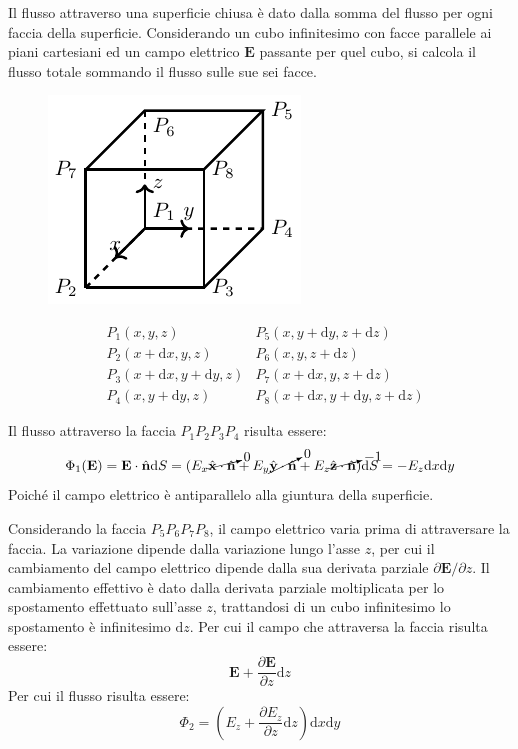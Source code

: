\documentclass{article}
\newcommand{\vect}[1]{\boldsymbol{\mathbf{#1}}}
\newcommand{\df}{\mathrm{d}}
\numberwithin{equation}{subsection}
\begin{document}
Il flusso attraverso una superficie chiusa è dato dalla somma del flusso per ogni faccia della superficie. Considerando un cubo infinitesimo con facce parallele ai piani 
cartesiani ed un campo elettrico $\vect{E}$ passante per quel cubo, si calcola il flusso totale sommando il flusso sulle sue sei facce. 
\begin{figure}[H]%
    \centering
    \includegraphics{teorema-divergenza.pdf}%
    \label{fig:teorema-divergenza}
\end{figure}
\begin{align*}
    &P_1(x,y,z) &P_5(x,y+\df  y,z+\df z)\\
    &P_2(x+\df  x,y,z) &P_6(x,y,z+\df z)\\
    &P_3(x+\df  x,y+\df  y,z) &P_7(x+\df  x,y,z+\df z)\\
    &P_4(x,y+\df  y,z) &P_8(x+\df  x,y+\df  y,z+\df z)
\end{align*}

Il flusso attraverso la faccia $P_1P_2P_3P_4$ risulta essere:
\begin{equation*}
    \Phi_1(\vect{E})=\vect{E}\cdot\hat{\vect{n}}\df S=(E_x\cancelto{0}{\hat{\vect{x}}\cdot\hat{\vect{n}}}+E_y\cancelto{0}{\hat{\vect{y}}\cdot\hat{\vect{n}}}+E_z\cancelto{-1}{\hat{\vect{z}}\cdot\hat{\vect{n}}})\df S=-E_z\df x\df y
\end{equation*}
Poiché il campo elettrico è antiparallelo alla giuntura della superficie. 


Considerando la faccia $P_5P_6P_7P_8$, il campo elettrico varia prima di attraversare la faccia. La variazione dipende dalla variazione lungo l'asse $z$, per cui il cambiamento 
del campo elettrico dipende dalla sua derivata parziale ${\partial\vect{E}}/{\partial z}$. Il cambiamento effettivo è dato dalla derivata parziale 
moltiplicata per lo spostamento effettuato sull'asse $z$, trattandosi di un cubo infinitesimo lo spostamento è infinitesimo $\df z$. Per cui il campo che attraversa la faccia 
risulta essere:
\begin{equation*}
    \vect{E}+\displaystyle\frac{\partial \vect{E}}{\partial z}\df z
\end{equation*} 
Per cui il flusso risulta essere:
\begin{equation*}
    \Phi_2=\left(E_z+\displaystyle\frac{\partial E_z}{\partial z}\df z\right)\df x\df y
\end{equation*}
\end{document}
